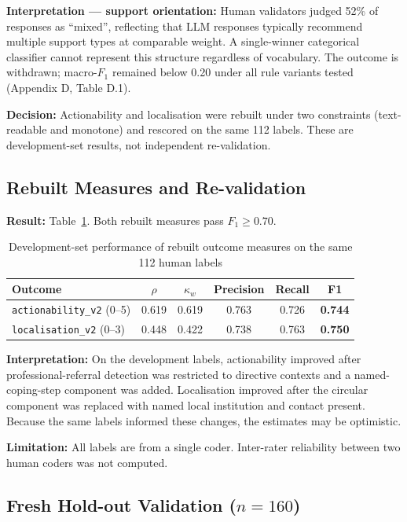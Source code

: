 \textbf{Interpretation --- support orientation:} Human validators judged 52\% of responses as ``mixed'', reflecting that LLM responses typically recommend multiple support types at comparable weight. A single-winner categorical classifier cannot represent this structure regardless of vocabulary. The outcome is withdrawn; macro-$F_1$ remained below 0.20 under all rule variants tested (Appendix D, Table D.1).

\textbf{Decision:} Actionability and localisation were rebuilt under two constraints (text-readable and monotone) and rescored on the same 112 labels. These are development-set results, not independent re-validation.

\subsection{Rebuilt Measures and Re-validation}

\textbf{Result:} Table~\ref{tab:val2}. Both rebuilt measures pass $F_1 \geq 0.70$.

\begin{table}[H]
\centering
\caption{Development-set performance of rebuilt outcome measures on the same 112 human labels}
\label{tab:val2}
\begin{tabular}{lccccc}
\toprule
Outcome & $\rho$ & $\kappa_w$ & Precision & Recall & F1 \\
\midrule
\texttt{actionability\_v2} (0--5) & 0.619 & 0.619 & 0.763 & 0.726 & \textbf{0.744} \\
\texttt{localisation\_v2} (0--3) & 0.448 & 0.422 & 0.738 & 0.763 & \textbf{0.750} \\
\bottomrule
\end{tabular}
\end{table}

\textbf{Interpretation:} On the development labels, actionability improved after professional-referral detection was restricted to directive contexts and a named-coping-step component was added. Localisation improved after the circular component was replaced with named local institution and contact present. Because the same labels informed these changes, the estimates may be optimistic.

\textbf{Limitation:} All labels are from a single coder. Inter-rater reliability between two human coders was not computed.

\subsection{Fresh Hold-out Validation ($n=160$)}

